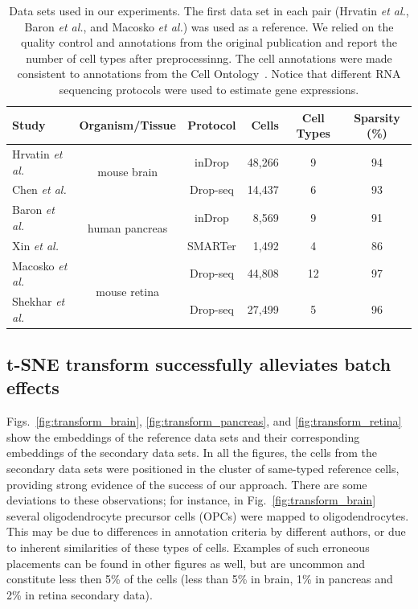 \documentclass[runningheads]{llncs}
\newcommand{\etal}{\textit{et al.}}
\begin{document}
\vspace{-3mm}
\begin{table}[ht]
\begin{center}
\setlength\tabcolsep{4pt}
\begin{tabular}{l c c r c c}
\toprule
Study & Organism/Tissue & Protocol & Cells & Cell Types & Sparsity (\%) \\
\midrule
Hrvatin \etal & \multirow{2}{*}{mouse brain} & inDrop & 48,266 & 9 & 94 \\
Chen \etal & & Drop-seq & 14,437 & 6 & 93 \\[5pt]
Baron \etal & \multirow{2}{*}{human pancreas} & inDrop & 8,569 & 9 & 91 \\
Xin \etal & & SMARTer & 1,492 & 4 & 86 \\[5pt]
Macosko \etal & \multirow{2}{*}{mouse retina} & Drop-seq & 44,808 & 12 & 97 \\
Shekhar \etal & & Drop-seq & 27,499 & 5 & 96 \\
\bottomrule
\end{tabular}
\end{center}
\caption{Data sets used in our experiments. The first data set in each pair
(Hrvatin \etal, Baron \etal, and Macosko \etal) was used as a reference.  We
relied on the quality control and annotations from the original publication
and report the number of cell types after preprocessinng.  The cell
annotations were made consistent to annotations from the Cell
Ontology~\cite{Bard2005}. Notice that different RNA sequencing protocols
were used to estimate gene expressions.}
\label{tab:data sets}
\end{table}

\subsection{t-SNE transform successfully alleviates batch effects}
\label{sec:results}

Figs.~\ref{fig:transform_brain}, \ref{fig:transform_pancreas}, and
\ref{fig:transform_retina} show the embeddings of the reference data sets and
their corresponding embeddings of the secondary data sets. In all the figures,
the cells from the secondary data sets were positioned in the cluster of
same-typed reference cells, providing strong evidence of the success of our approach. There are some deviations to these observations; for
instance, in Fig.~\ref{fig:transform_brain} several oligodendrocyte precursor
cells (OPCs) were mapped to oligodendrocytes. This may be due to differences in
annotation criteria by different authors, or due to inherent similarities of
these types of cells. Examples of such erroneous placements can be found in
other figures as well, but are uncommon and constitute less then 5\% of
the cells (less than 5\% in brain, 1\% in pancreas and 2\% in retina
secondary data).
\end{document}
